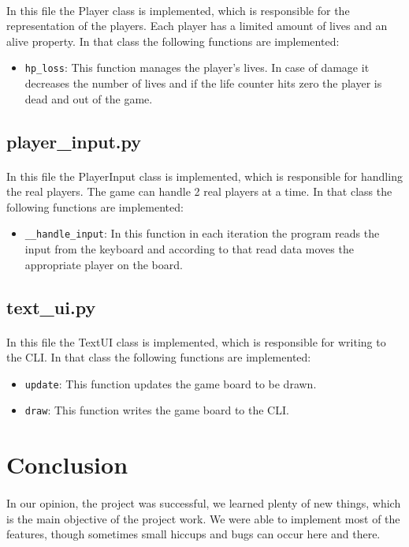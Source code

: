 \documentclass{article}
\begin{document}
        \paragraph{}
        In this file the Player class is implemented, which is responsible for the representation of the players. Each player has a limited amount of lives and an alive property. In that class the following functions are implemented:
        \begin{itemize}
            \item \verb|hp_loss|: This function manages the player's lives. In case of damage it decreases the number of lives and if the life counter hits zero the player is dead and out of the game.
        \end{itemize}

    \subsection{player\_input.py}
        \paragraph{}
        In this file the PlayerInput class is implemented, which is responsible for handling the real players. The game can handle 2 real players at a time. In that class the following functions are implemented:
        \begin{itemize}
            \item \verb|__handle_input|: In this function in each iteration the program reads the input from the keyboard and according to that read data moves the appropriate player on the board.
        \end{itemize}

    \subsection{text\_ui.py}
        \paragraph{}
        In this file the TextUI class is implemented, which is responsible for writing to the CLI. In that class the following functions are implemented:
        \begin{itemize}
            \item \verb|update|: This function updates the game board to be drawn.
            \item \verb|draw|: This function writes the game board to the CLI.
        \end{itemize}

\section{Conclusion}

    \paragraph{}
    In our opinion, the project was successful, we learned plenty of new things, which is the main objective of the project work. We were able to implement most of the features, though sometimes small hiccups and bugs can occur here and there.
\end{document}
